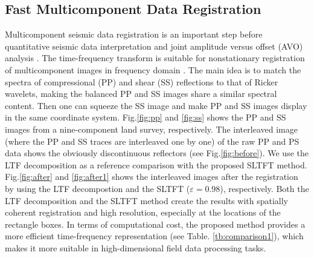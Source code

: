 

\subsection{Fast Multicomponent Data Registration}

Multicomponent seismic data registration is an important step before
quantitative seismic data interpretation and joint amplitude versus
offset (AVO) analysis \cite[]{lu2015,gao2018}. The time-frequency
transform is suitable for nonstationary registration of multicomponent
images in frequency domain \cite[]{Liu13,chen2021}. The main idea is
to match the spectra of compressional (PP) and shear (SS) reflections
to that of Ricker wavelets, making the balanced PP and SS images share
a similar spectral content. Then one can squeeze the SS image and make
PP and SS images display in the same coordinate
system. Fig.\ref{fig:pp} and \ref{fig:ss} shows the PP and
SS images from a nine-component land survey, respectively. The
interleaved image (where the PP and SS traces are interleaved one by
one) of the raw PP and PS data shows the obviously discontinuous
reflectors (see Fig.\ref{fig:before}). We use the LTF
decomposition as a reference comparison with the proposed SLTFT
method. Fig.\ref{fig:after} and \ref{fig:after1} shows the
interleaved images after the registration by using the LTF
decompostion and the SLTFT ($\varepsilon=0.98$), respectively. Both
the LTF decomposition and the SLTFT method create the results with
spatially coherent registration and high resolution, especially at the
locations of the rectangle boxes. In terms of computational cost, the
proposed method provides a more efficient time-frequency
representation (see Table. \ref{tb:comparison1}), which makes it more
suitable in high-dimensional field data processing tasks.



